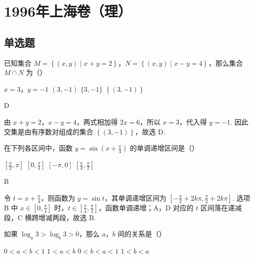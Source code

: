 \chapter{1996年上海卷（理）}
\section{单选题}

\begin{problem}
已知集合 \(M=\left\{(x,y)\mid x+y=2\right\}\)，\(N=\left\{(x,y)\mid x-y=4\right\}\)，那么集合 \(M\cap N\) 为（\quad）

\choices
    {\(x=3\)，\(y=-1\)}
    {\((3,-1)\)}
    {\(\{3,-1\}\)}
    {\(\left\{(3,-1)\right\}\)}
\end{problem}

\begin{answer}
D
\end{answer}

\begin{solution}
由 \(x+y=2\)，\(x-y=4\)，两式相加得 \(2x=6\)，所以 \(x=3\)，代入得 \(y=-1\). 因此交集是由有序数对组成的集合 \(\left\{(3,-1)\right\}\)，故选 D.
\end{solution}

\begin{problem}
在下列各区间中，函数 \(y=\sin\left(x+\frac{\pi}{4}\right)\) 的单调递增区间是（\quad）

\choices
    {\(\left[\frac{\pi}{2},\pi\right]\)}
    {\(\left[0,\frac{\pi}{4}\right]\)}
    {\(\left[-\pi,0\right]\)}
    {\(\left[\frac{\pi}{4},\frac{\pi}{2}\right]\)}
\end{problem}

\begin{answer}
B
\end{answer}

\begin{solution}
令 \(t=x+\frac{\pi}{4}\)，则函数为 \(y=\sin t\)，其单调递增区间为 \(\left[-\frac{\pi}{2}+2k\pi,\frac{\pi}{2}+2k\pi\right]\). 选项 B 中 \(x\in\left[0,\frac{\pi}{4}\right]\) 时，\(t\in\left[\frac{\pi}{4},\frac{\pi}{2}\right]\)，函数单调递增；A，D 对应的 \(t\) 区间落在递减段，C 横跨增减两段，故选 B.
\end{solution}

\begin{problem}
如果 \(\log_{a}3>\log_{b}3>0\)，那么 \(a\)，\(b\) 间的关系是（\quad）

\choices
    {\(0<a<b<1\)}
    {\(1<a<b\)}
    {\(0<b<a<1\)}
    {\(1<b<a\)}
\end{problem}

